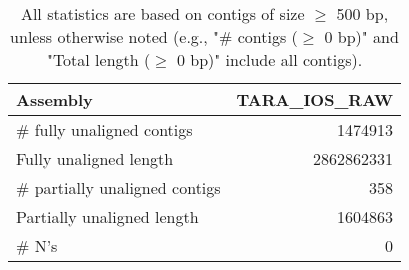 \documentclass[12pt,a4paper]{article}
\begin{document}
\begin{table}[ht]
\begin{center}
\caption{All statistics are based on contigs of size $\geq$ 500 bp, unless otherwise noted (e.g., "\# contigs ($\geq$ 0 bp)" and "Total length ($\geq$ 0 bp)" include all contigs).}
\begin{tabular}{|l*{1}{|r}|}
\hline
Assembly & TARA\_IOS\_RAW \\ \hline
\# fully unaligned contigs & 1474913 \\ \hline
Fully unaligned length & 2862862331 \\ \hline
\# partially unaligned contigs & 358 \\ \hline
Partially unaligned length & 1604863 \\ \hline
\# N's & 0 \\ \hline
\end{tabular}
\end{center}
\end{table}
\end{document}
